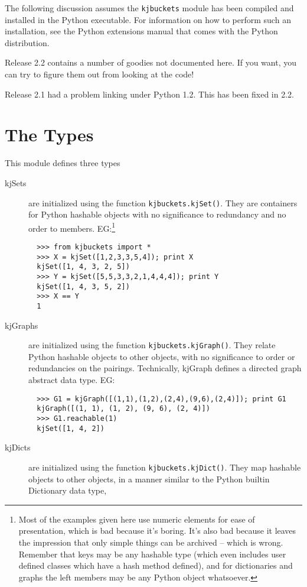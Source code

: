The following discussion assumes the {\tt kjbuckets} module has been
compiled and installed in the Python executable.  For information on
how to perform such an installation, see the Python extensions manual
that comes with the Python distribution.

Release 2.2 contains a number of goodies not documented here.
If you want, you can try to figure them out from looking at the
code!

Release 2.1 had a problem linking under Python 1.2.
This has been fixed in 2.2.

\section{The Types}

This module defines three types
\begin{description}
\item[kjSets]
are initialized using the function {\tt kjbuckets.kjSet()}.  They are
containers for Python hashable objects with no significance to
redundancy and no order to members. EG:\footnote{Most of the
examples given here use numeric elements for ease of presentation, 
which is bad because it's
boring.  It's also bad because it leaves the impression that only
simple things can be archived -- which is wrong.  Remember that
keys may be any hashable type (which even includes user defined
classes which have a hash method defined), and for dictionaries
and graphs the left members may be any Python object whatsoever.}
\begin{verbatim}
  >>> from kjbuckets import *
  >>> X = kjSet([1,2,3,3,5,4]); print X
  kjSet([1, 4, 3, 2, 5])
  >>> Y = kjSet([5,5,3,3,2,1,4,4,4]); print Y
  kjSet([1, 4, 3, 5, 2])
  >>> X == Y
  1
\end{verbatim}
\item[kjGraphs]
are initialized using the function {\tt kjbuckets.kjGraph()}.  They
relate Python hashable objects to other objects, with no
significance to order or redundancies on the pairings.  
Technically, kjGraph defines a directed graph abstract data type.
EG:
\begin{verbatim}
  >>> G1 = kjGraph([(1,1),(1,2),(2,4),(9,6),(2,4)]); print G1
  kjGraph([(1, 1), (1, 2), (9, 6), (2, 4)])
  >>> G1.reachable(1)
  kjSet([1, 4, 2])
\end{verbatim}
\item[kjDicts]
are initialized using the function {\tt kjbuckets.kjDict()}.
They map hashable objects to other objects, in a manner
similar to the Python builtin Dictionary data type,

\end{description}
